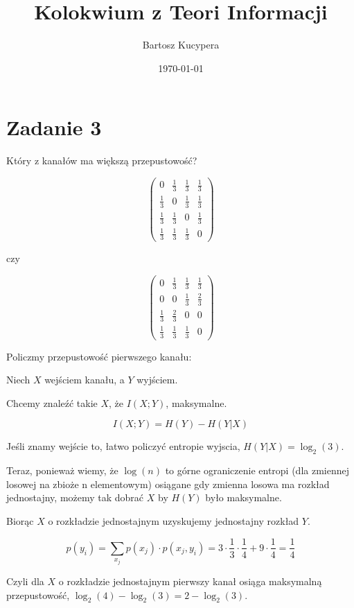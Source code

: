 \documentclass{article}
\title{Kolokwium z Teori Informacji}
\author{Bartosz Kucypera}
\date{\today}
\begin{document}
\maketitle

\section*{Zadanie 3}

Który z kanałów ma większą przepustowość? 

$$ \begin{pmatrix}
0 & \frac{1}{3} & \frac{1}{3} & \frac{1}{3} \\
\frac{1}{3} & 0 & \frac{1}{3} & \frac{1}{3} \\
\frac{1}{3} & \frac{1}{3} & 0 & \frac{1}{3} \\
\frac{1}{3} & \frac{1}{3} & \frac{1}{3} & 0 
\end{pmatrix}  $$

czy 

$$ \begin{pmatrix}
0 & \frac{1}{3} & \frac{1}{3} & \frac{1}{3} \\
0 & 0 & \frac{1}{3} & \frac{2}{3} \\
\frac{1}{3} & \frac{2}{3} & 0 & 0 \\
\frac{1}{3} & \frac{1}{3} & \frac{1}{3} & 0 
\end{pmatrix}  $$

Policzmy przepustowość pierwszego kanału:

Niech $X$ wejściem kanału, a $Y$ wyjściem.

Chcemy znaleźć takie $X$, że $I(X;Y)$, maksymalne.

$$I(X;Y) = H(Y) - H(Y|X)$$

Jeśli znamy wejście to, łatwo policzyć entropie wyjscia, $H(Y|X) = \log_2(3)$.

Teraz, ponieważ wiemy, że $\log(n)$ to górne ograniczenie entropi (dla zmiennej losowej na zbioże n elementowym) osiągane gdy zmienna losowa ma rozkład jednostajny, możemy tak dobrać $X$ by $H(Y)$ było maksymalne.

Biorąc $X$ o rozkładzie jednostajnym uzyskujemy jednostajny rozkład $Y$.

$$p(y_i) = \sum_{x_j} p(x_j) \cdot p(x_j, y_i) = 3 \cdot \frac{1}{3} \cdot \frac{1}{4} + 9\cdot \frac{1}{4} = \frac{1}{4}$$

Czyli dla $X$ o rozkładzie jednostajnym pierwszy kanał osiąga maksymalną przepustowość, $\log_2(4)-\log_2(3) = 2 - \log_2(3)$.
\end{document}
